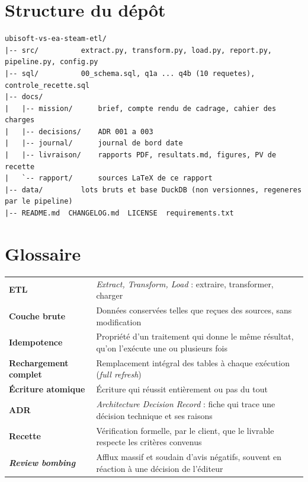 \documentclass[11pt, a4paper, oneside, headings=normal, numbers=noenddot, DIV=12]{scrartcl}
\begin{document}
\section{Structure du dépôt}
\begin{lstlisting}[basicstyle=\ttfamily\footnotesize]
ubisoft-vs-ea-steam-etl/
|-- src/          extract.py, transform.py, load.py, report.py, pipeline.py, config.py
|-- sql/          00_schema.sql, q1a ... q4b (10 requetes), controle_recette.sql
|-- docs/
|   |-- mission/      brief, compte rendu de cadrage, cahier des charges
|   |-- decisions/    ADR 001 a 003
|   |-- journal/      journal de bord date
|   |-- livraison/    rapports PDF, resultats.md, figures, PV de recette
|   `-- rapport/      sources LaTeX de ce rapport
|-- data/         lots bruts et base DuckDB (non versionnes, regeneres par le pipeline)
|-- README.md  CHANGELOG.md  LICENSE  requirements.txt
\end{lstlisting}

\section{Glossaire}
\begin{tabularx}{\linewidth}{@{}>{\bfseries}L{3.6cm} Y@{}}
ETL & \emph{Extract, Transform, Load} : extraire, transformer, charger \\
Couche brute & Données conservées telles que reçues des sources, sans modification \\
Idempotence & Propriété d'un traitement qui donne le même résultat, qu'on l'exécute une ou plusieurs fois \\
Rechargement complet & Remplacement intégral des tables à chaque exécution (\emph{full refresh}) \\
Écriture atomique & Écriture qui réussit entièrement ou pas du tout \\
ADR & \emph{Architecture Decision Record} : fiche qui trace une décision technique et ses raisons \\
Recette & Vérification formelle, par le client, que le livrable respecte les critères convenus \\
\emph{Review bombing} & Afflux massif et soudain d'avis négatifs, souvent en réaction à une décision de l'éditeur \\
\end{tabularx}
\end{document}
